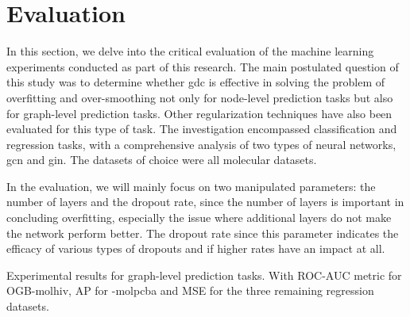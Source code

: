%
\chapter{Evaluation}
\label{sec:eval}

In this section, we delve into the critical evaluation of the machine learning experiments conducted as part of this research.
The main postulated question of this study was to determine whether \ac{gdc} is effective in solving the problem of overfitting and over-smoothing not only for node-level prediction tasks but also for graph-level prediction tasks. Other regularization techniques have also been evaluated for this type of task.
The investigation encompassed classification and regression tasks, with a comprehensive analysis of two types of neural networks, \ac{gcn} and \ac{gin}.
The datasets of choice were all molecular datasets.

In the evaluation, we will mainly focus on two manipulated parameters: the number of layers and the dropout rate, since the number of layers is important in concluding overfitting, especially the issue where additional layers do not make the network perform better. The dropout rate since this parameter indicates the efficacy of various types of dropouts and if higher rates have an impact at all.





\begin{table*}[t]
    \caption{
        Experimental results for graph-level prediction tasks. With ROC-AUC metric for OGB-molhiv, AP for -molpcba and MSE for the three remaining regression datasets.
    }\label{tbl:eval:results}
    \centering
    {\small%
        }
\end{table*}

